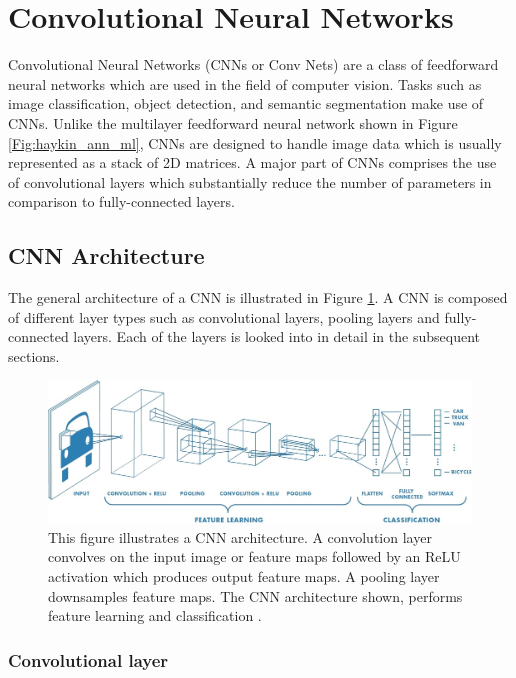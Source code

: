 \section{Convolutional Neural Networks}
\label{section:cnn}

Convolutional Neural Networks (CNNs or Conv Nets) are a class of feedforward neural networks which are used in the field of computer vision. Tasks such as image classification, object detection, and semantic segmentation make use of CNNs. Unlike the multilayer feedforward neural network shown in Figure \ref{Fig:haykin_ann_ml}, CNNs are designed to handle image data which is usually represented as a stack of 2D matrices. A major part of CNNs comprises the use of convolutional layers which substantially reduce the number of parameters in comparison to fully-connected layers.

\subsection{CNN Architecture}

The general architecture of a CNN is illustrated in Figure \ref{Fig:cnn_arch}. A CNN is composed of different layer types such as convolutional layers, pooling layers and fully-connected layers. Each of the layers is looked into in detail in the subsequent sections.
	
	\begin{figure}[h]
		\centering
		\includegraphics[width=1\linewidth]{images/cnn_matlab}
		\caption{This figure illustrates a CNN architecture. A convolution layer convolves on the input image or feature maps followed by an ReLU activation which produces output feature maps. A pooling layer downsamples feature maps. The CNN architecture shown, performs feature learning and classification \cite{matlab_cnn}.}
		\label{Fig:cnn_arch}
	\end{figure}

\subsubsection{Convolutional layer}


